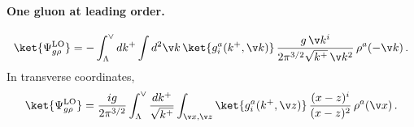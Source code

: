 \paragraph{One gluon at leading order.}
\begin{align}\label{lowav1mom}
\ket{\Psi^{\rm LO}_{g\rho}} =-\int_{\Lambda}^{\vee}dk^{+}\int d^{2}\v k\,\ket{g^{a}_{i}(k^{+},\v k)}\,
\frac{g\,\v k^{i}}{2\pi^{3/2}\sqrt{k^{+}}\,\v k^{2}}\,\rho^{a}(-\v k)\,.
\end{align}
In transverse coordinates,
\begin{align}\label{lowav1}
\ket{\Psi^{\rm LO}_{g\rho}} =\frac{ig}{2\pi^{3/2}}\int_{\Lambda}^{\vee}\frac{dk^{+}}{\sqrt{k^{+}}}\int_{\v x,\v z}
\ket{g^{a}_{i}(k^{+},\v z)}\,\frac{(x-z)^{i}}{(x-z)^{2}}\,\rho^{a}(\v x)\,.
\end{align}

